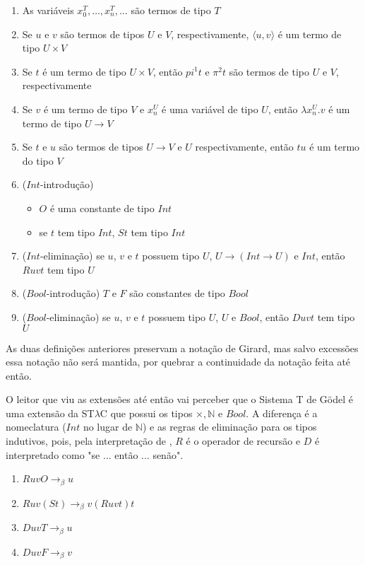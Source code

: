 \documentclass[../main.tex]{subfiles}
\begin{document}
\begin{definition}
    \hfill
    \begin{enumerate}
        \item As variáveis $x_0^T, \dots, x_n^T, \dots$ são termos de tipo $T$
        \item Se $u$ e $v$ são termos de tipos $U$ e $V$, respectivamente, $\langle u, v \rangle$ é um termo de tipo $U \times V$
        \item Se $t$ é um termo de tipo $U \times V$, então $pi^1 t$ e $\pi^2 t$ são termos de tipo $U$ e $V$, respectivamente
        \item Se $v$ é um termo de tipo $V$ e $x_n^U$ é uma variável de tipo $U$, então $\lambda x^U_n . v$ é um termo de tipo $U \to V$
        \item Se $t$ e $u$ são termos de tipos $U \to V$ e $U$ respectivamente, então $tu$ é um termo do tipo $V$
        \item ($Int$-introdução)
        \begin{itemize}
            \item $O$ é uma constante de tipo $Int$
            \item se $t$ tem tipo $Int$, $St$ tem tipo $Int$
        \end{itemize}
        \item ($Int$-eliminação) se $u$, $v$ e $t$ possuem tipo $U$, $U \to (Int \to U)$ e $Int$, então $Ruvt$ tem tipo $U$
        \item ($Bool$-introdução) $T$ e $F$ são constantes de tipo $Bool$
        \item ($Bool$-eliminação) se $u$, $v$ e $t$ possuem tipo $U$, $U$ e $Bool$, então $Duvt$ tem tipo $U$
    \end{enumerate}
\end{definition}

As duas definições anteriores preservam a notação de Girard, mas salvo excessões essa notação não será mantida, por quebrar a continuidade da notação feita até então. 

O leitor que viu as extensões até então vai perceber que o Sistema T de Gödel é uma extensão da ST$\lambda$C que possui os tipos $\times, \mathbb{N}$ e $Bool$. A diferença é a nomeclatura ($Int$ no lugar de $\mathbb{N}$) e as regras de eliminação para os tipos indutivos, pois, pela interpretação de  \cite{girard1989}, $R$ é o operador de recursão e $D$ é interpretado como "se ... então ... senão".

\begin{definition}
    \hfill
    \begin{enumerate}
        \item $RuvO \to_{\beta} u$
        \item $Ruv(St) \to_{\beta} v(Ruvt)t$
        \item $DuvT \to_{\beta} u$
        \item $DuvF \to_{\beta} v$
    \end{enumerate}
\end{definition}
\end{document}
